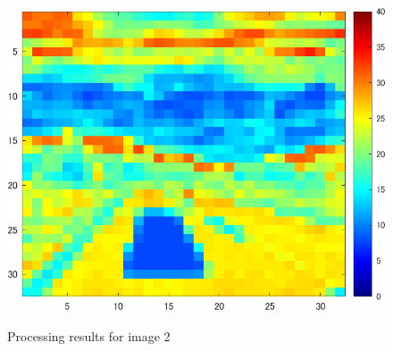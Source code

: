 \documentclass[conference]{IEEEtran}
\begin{document}
\begin{figure}[tb]
\begin{minipage}[t]{0.32\linewidth}
    \label{fig:3-2-3}
  \end{minipage}
  \begin{minipage}[t]{0.32\linewidth}
    \centering
    \includegraphics[width=0.9\columnwidth]{figures/Ex_re4.png}
    \label{fig:3-2-4}
  \end{minipage}
  \caption{Processing results for image 2}
  \label{fig:3-2-1}
\end{figure}
\end{document}
